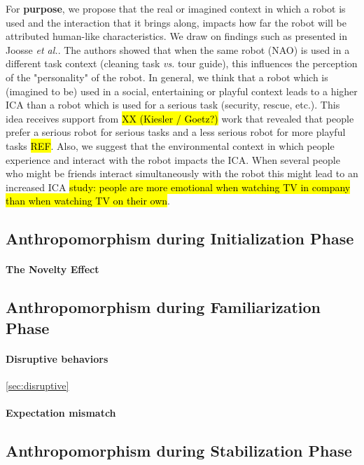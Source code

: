 \documentclass[lettersize, apacite, twoside, HRI]{apa_HRI}
\begin{document}
	For \textbf{purpose}, we propose that the real or imagined context in which a robot is used and the interaction that it brings along, impacts how far the robot will be attributed human-like characteristics. We	draw on findings such as presented in Joosse \textit{et al.}. The authors showed that when the same robot (NAO) is used in a different task context (cleaning task \textit{vs.} tour guide), this influences the perception of the "personality" of the robot. In general, we think that a robot which is (imagined to be) used in a social, entertaining or playful context leads to a higher ICA than a robot which is used for a serious task (security, rescue, etc.). This idea receives support from \hl{XX (Kiesler / Goetz?)} work that revealed that people prefer a serious robot for serious tasks and a less serious robot for more playful tasks \hl{REF}. Also, we suggest that the environmental context in which people experience and interact with the robot impacts the ICA. When several people who might be friends interact simultaneously with the robot this might lead to an increased ICA \hl{study: people are more emotional when watching TV in company than when watching TV on their own}.

\subsection{Anthropomorphism during Initialization Phase}
\label{sec:initialization}

\paragraph{The Novelty Effect}
\label{sec:noveltyeffect}

\subsection{Anthropomorphism during Familiarization Phase}
\label{sec:familiarization}

\paragraph{Disruptive behaviors}
\ref{sec:disruptive}

\paragraph{Expectation mismatch}

\subsection{Anthropomorphism during Stabilization Phase}
\label{sec:stabilization}
\end{document}
